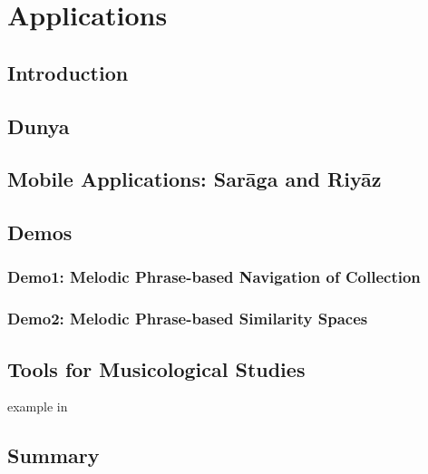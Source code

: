 
\chapter{Applications}
\label{sec:applicatoins}

\section{Introduction}
\section{Dunya}
\section{Mobile Applications: Sar\={a}ga and Riy\={a}z}
\section{Demos}
\subsection*{Demo1: Melodic Phrase-based Navigation of Collection}
\subsection*{Demo2: Melodic Phrase-based Similarity Spaces}
\section{Tools for Musicological Studies}
example in \cite{kaustuv_ismir_2016}

\cite{essentia}
\cite{bogdanov2013essentia}

\cite{senturk2013score}
\cite{senturk2014towards}

\cite{CM_Corpora_Ajay14}

\cite{koduri2012raga}
\cite{koduri2011survey}

\cite{sordo2012musically}


\section{Summary}



